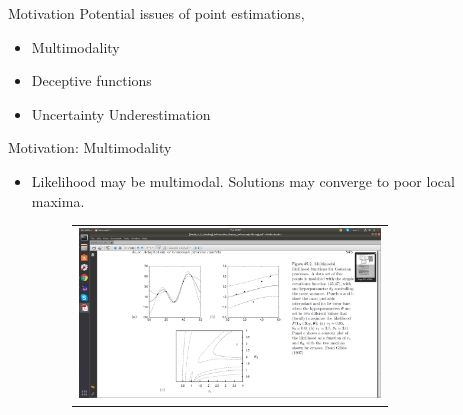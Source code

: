 \documentclass{beamer}
\begin{document}
\begin{frame}{Motivation}
Potential issues of point estimations,

\begin{itemize}
	\item Multimodality
	\item Deceptive functions
	\item Uncertainty Underestimation
\end{itemize}

\end{frame}

\begin{frame}{Motivation: Multimodality}

\begin{itemize}
	\item Likelihood may be multimodal. Solutions may converge to poor local maxima. 	
	\begin{figure}
		\centering
		\begin{tabular}{c}
			\includegraphics[width=8cm, trim={11.5cm 1cm 20cm 7cm},clip]{Mackay.png}
		\end{tabular}
	\end{figure}
\end{itemize}

\end{frame}
\end{document}
